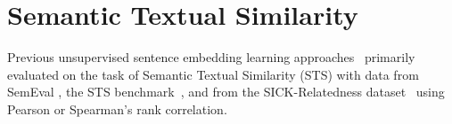 \documentclass[11pt,a4paper]{article}
\begin{document}
\begin{table}[t]
\centering
{}
\caption{Evaluation on the STS datasets.}
\label{tbl:sts_results}
\end{table}

\section{Semantic Textual Similarity}
\label{sec:STS_results}

Previous unsupervised sentence embedding learning approaches~\citep{DBLP:journals/corr/abs-2006-03659,carlsson2021semantic,DBLP:conf/emnlp/LiZHWYL20,su2021whitening} primarily evaluated on the task of Semantic Textual Similarity (STS) with data from SemEval \citep{DBLP:conf/semeval/AgirreCDG12,DBLP:conf/starsem/AgirreCDGG13,DBLP:conf/semeval/AgirreBCCDGGMRW14,DBLP:conf/semeval/AgirreBCCDGGLMM15,DBLP:conf/semeval/AgirreBCDGMRW16}, the STS benchmark~\citep{cer-etal-2017-semeval}, and from the SICK-Relatedness dataset~\citep{DBLP:conf/lrec/MarelliMBBBZ14} using Pearson or Spearman's rank correlation. 
\end{document}
